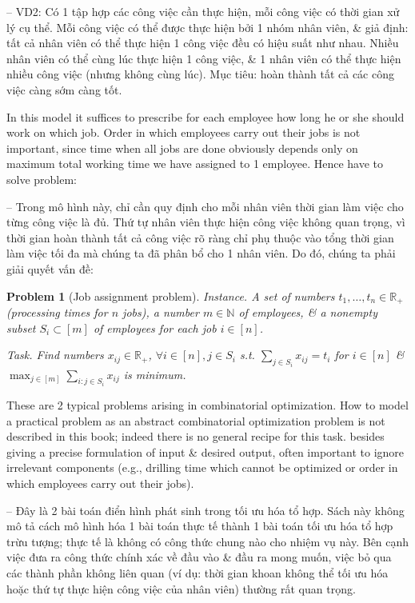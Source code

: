 \documentclass{article}
\newtheorem{problem}{Problem}
\begin{document}
\begin{itemize}
    -- VD2: Có 1 tập hợp các công việc cần thực hiện, mỗi công việc có thời gian xử lý cụ thể. Mỗi công việc có thể được thực hiện bởi 1 nhóm nhân viên, \& giả định: tất cả nhân viên có thể thực hiện 1 công việc đều có hiệu suất như nhau. Nhiều nhân viên có thể cùng lúc thực hiện 1 công việc, \& 1 nhân viên có thể thực hiện nhiều công việc (nhưng không cùng lúc). Mục tiêu: hoàn thành tất cả các công việc càng sớm càng tốt.

    In this model it suffices to prescribe for each employee how long he or she should work on which job. Order in which employees carry out their jobs is not important, since time when all jobs are done obviously depends only on maximum total working time we have assigned to 1 employee. Hence have to solve problem:

    -- Trong mô hình này, chỉ cần quy định cho mỗi nhân viên thời gian làm việc cho từng công việc là đủ. Thứ tự nhân viên thực hiện công việc không quan trọng, vì thời gian hoàn thành tất cả công việc rõ ràng chỉ phụ thuộc vào tổng thời gian làm việc tối đa mà chúng ta đã phân bổ cho 1 nhân viên. Do đó, chúng ta phải giải quyết vấn đề:

    \begin{problem}[Job assignment problem]
        \item {\sf Instance.} A set of numbers $t_1,\ldots,t_n\in\mathbb{R}_+$ (processing times for $n$ jobs), a number $m\in\mathbb{N}$ of employees, \& a nonempty subset $S_i\subset[m]$ of employees for each job $i\in[n]$.
        \item {\sf Task.} Find numbers $x_{ij}\in\mathbb{R}_+$, $\forall i\in[n],j\in S_i$ s.t. $\sum_{j\in S_i} x_{ij} = t_i$ for $i\in[n]$ \& $\max_{j\in[m]} \sum_{i:j\in S_i} x_{ij}$ is minimum.
    \end{problem}
    These are 2 typical problems arising in combinatorial optimization. How to model a practical problem as an abstract combinatorial optimization problem is not described in this book; indeed there is no general recipe for this task. besides giving a precise formulation of input \& desired output, often important to ignore irrelevant components (e.g., drilling time which cannot be optimized or order in which employees carry out their jobs).

    -- Đây là 2 bài toán điển hình phát sinh trong tối ưu hóa tổ hợp. Sách này không mô tả cách mô hình hóa 1 bài toán thực tế thành 1 bài toán tối ưu hóa tổ hợp trừu tượng; thực tế là không có công thức chung nào cho nhiệm vụ này. Bên cạnh việc đưa ra công thức chính xác về đầu vào \& đầu ra mong muốn, việc bỏ qua các thành phần không liên quan (ví dụ: thời gian khoan không thể tối ưu hóa hoặc thứ tự thực hiện công việc của nhân viên) thường rất quan trọng.


\end{itemize}
\end{document}
